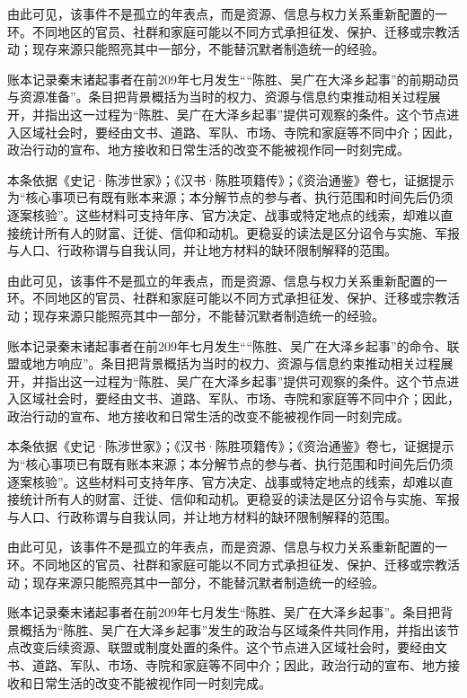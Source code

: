 由此可见，该事件不是孤立的年表点，而是资源、信息与权力关系重新配置的一环。不同地区的官员、社群和家庭可能以不同方式承担征发、保护、迁移或宗教活动；现存来源只能照亮其中一部分，不能替沉默者制造统一的经验。

账本记录秦末诸起事者在前209年七月发生““陈胜、吴广在大泽乡起事”的前期动员与资源准备”。条目把背景概括为当时的权力、资源与信息约束推动相关过程展开，并指出这一过程为“陈胜、吴广在大泽乡起事”提供可观察的条件。这个节点进入区域社会时，要经由文书、道路、军队、市场、寺院和家庭等不同中介；因此，政治行动的宣布、地方接收和日常生活的改变不能被视作同一时刻完成。

本条依据《史记·陈涉世家》；《汉书·陈胜项籍传》；《资治通鉴》卷七，证据提示为“核心事项已有既有账本来源；本分解节点的参与者、执行范围和时间先后仍须逐案核验”。这些材料可支持年序、官方决定、战事或特定地点的线索，却难以直接统计所有人的财富、迁徙、信仰和动机。更稳妥的读法是区分诏令与实施、军报与人口、行政称谓与自我认同，并让地方材料的缺环限制解释的范围。

由此可见，该事件不是孤立的年表点，而是资源、信息与权力关系重新配置的一环。不同地区的官员、社群和家庭可能以不同方式承担征发、保护、迁移或宗教活动；现存来源只能照亮其中一部分，不能替沉默者制造统一的经验。

账本记录秦末诸起事者在前209年七月发生““陈胜、吴广在大泽乡起事”的命令、联盟或地方响应”。条目把背景概括为当时的权力、资源与信息约束推动相关过程展开，并指出这一过程为“陈胜、吴广在大泽乡起事”提供可观察的条件。这个节点进入区域社会时，要经由文书、道路、军队、市场、寺院和家庭等不同中介；因此，政治行动的宣布、地方接收和日常生活的改变不能被视作同一时刻完成。

本条依据《史记·陈涉世家》；《汉书·陈胜项籍传》；《资治通鉴》卷七，证据提示为“核心事项已有既有账本来源；本分解节点的参与者、执行范围和时间先后仍须逐案核验”。这些材料可支持年序、官方决定、战事或特定地点的线索，却难以直接统计所有人的财富、迁徙、信仰和动机。更稳妥的读法是区分诏令与实施、军报与人口、行政称谓与自我认同，并让地方材料的缺环限制解释的范围。

由此可见，该事件不是孤立的年表点，而是资源、信息与权力关系重新配置的一环。不同地区的官员、社群和家庭可能以不同方式承担征发、保护、迁移或宗教活动；现存来源只能照亮其中一部分，不能替沉默者制造统一的经验。

账本记录秦末诸起事者在前209年七月发生“陈胜、吴广在大泽乡起事”。条目把背景概括为“陈胜、吴广在大泽乡起事”发生的政治与区域条件共同作用，并指出该节点改变后续资源、联盟或制度处置的条件。这个节点进入区域社会时，要经由文书、道路、军队、市场、寺院和家庭等不同中介；因此，政治行动的宣布、地方接收和日常生活的改变不能被视作同一时刻完成。

